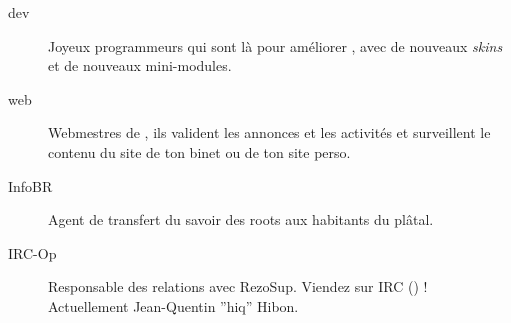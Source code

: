 \begin{description}
  \item[dev]{Joyeux programmeurs qui sont l\`a pour am\'eliorer \fkz, avec de nouveaux \emph{skins} et de nouveaux mini-modules.}


  \item[web] {Webmestres de \fkz, ils valident les annonces et les activit\'es et surveillent le contenu du site de ton binet ou de ton site perso.}


  \item[InfoBR]{Agent de transfert du savoir des roots aux habitants du pl\^atal.}



  \item[IRC-Op]{Responsable des relations avec RezoSup. Viendez sur IRC () ! \linebreak Actuellement Jean-Quentin ''hiq'' Hibon.}




\end{description}

